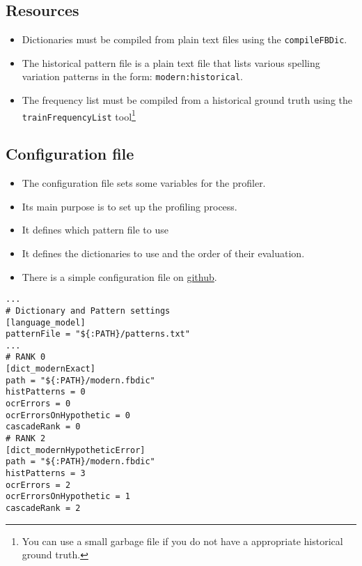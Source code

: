 \subsection{Resources}
\begin{frame}
	\begin{itemize}
		\item Dictionaries must be compiled from plain text files using the
			\texttt{compileFBDic}.
		\item The historical pattern file is a plain text file that lists various
			spelling variation patterns in the form: \texttt{modern:historical}.
		\item The frequency list must be compiled from a historical ground truth
			using the \texttt{trainFrequencyList} tool\footnote{You can use a small
			garbage file if you do not have a appropriate historical ground truth.}
	\end{itemize}
\end{frame}

\subsection{Configuration file}
\begin{frame}
	\begin{itemize}
		\item The configuration file sets some variables for the profiler.
		\item Its main purpose is to set up the profiling process.
		\item It defines which pattern file to use
		\item It defines the dictionaries to use and the order of their evaluation.
		\item There is a simple configuration file on
			\href{https://github.com/cisocrgroup/Resources/blob/master/lexica/german.ini}{github}.
	\end{itemize}
\end{frame}

\begin{frame}[fragile]
	\begin{Verbatim}[fontsize=\small]
...
# Dictionary and Pattern settings
[language_model]
patternFile = "${:PATH}/patterns.txt"
...
# RANK 0
[dict_modernExact]
path = "${:PATH}/modern.fbdic"
histPatterns = 0
ocrErrors = 0
ocrErrorsOnHypothetic = 0
cascadeRank = 0
# RANK 2
[dict_modernHypotheticError]
path = "${:PATH}/modern.fbdic"
histPatterns = 3
ocrErrors = 2
ocrErrorsOnHypothetic = 1
cascadeRank = 2
	\end{Verbatim}
\end{frame}

